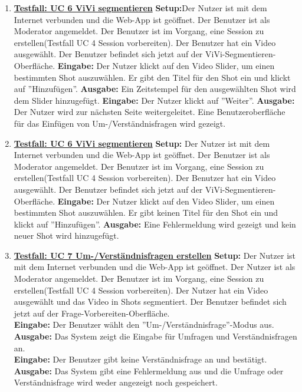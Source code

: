 \begin{enumerate}
	\item \underline{\textbf{Testfall: UC 6 ViVi segmentieren}} \linebreak
	\textbf{Setup:}Der Nutzer ist mit dem Internet verbunden und die Web-App ist geöffnet. Der Benutzer ist als Moderator angemeldet. Der Benutzer ist im Vorgang, eine Session zu erstellen(Testfall UC 4 Session vorbereiten). Der Benutzer hat ein Video ausgewählt. Der Benutzer befindet sich jetzt auf der ViVi-Segmentieren-Oberfläche.\linebreak
	\textbf{Eingabe:} Der Nutzer klickt auf den Video Slider, um einen bestimmten Shot auszuwählen. Er gibt den Titel für den Shot ein und klickt auf ''Hinzufügen''. \linebreak
	\textbf{Ausgabe:} Ein Zeitstempel für den ausgewählten Shot wird dem Slider hinzugefügt.\linebreak
	\textbf{Eingabe:} Der Nutzer klickt auf ''Weiter''. \linebreak
	\textbf{Ausgabe:} Der Nutzer wird zur nächsten Seite weitergeleitet. Eine Benutzeroberfläche für das Einfügen von Um-/Verständnisfragen wird gezeigt.
	
	\item \underline{\textbf{Testfall: UC 6 ViVi segmentieren}} \linebreak
	\textbf{Setup:} Der Nutzer ist mit dem Internet verbunden und die Web-App ist geöffnet. Der Benutzer ist als Moderator angemeldet. Der Benutzer ist im Vorgang, eine Session zu erstellen(Testfall UC 4 Session vorbereiten). Der Benutzer hat ein Video ausgewählt. Der Benutzer befindet sich jetzt auf der ViVi-Segmentieren-Oberfläche.\linebreak
	\textbf{Eingabe:} Der Nutzer klickt auf den Video Slider, um einen bestimmten Shot auszuwählen. Er gibt keinen Titel für den Shot ein und klickt auf ''Hinzufügen''. \linebreak
	\textbf{Ausgabe:} Eine Fehlermeldung wird gezeigt und kein neuer Shot wird hinzugefügt.
	
	\item \underline{\textbf{Testfall: UC 7 Um-/Verständnisfragen erstellen}} \linebreak
	\textbf{Setup:} Der Nutzer ist mit dem Internet verbunden und die Web-App ist geöffnet. Der Nutzer ist als Moderator angemeldet. Der Benutzer ist im Vorgang, eine Session zu erstellen(Testfall UC 4 Session vorbereiten). Der Nutzer hat ein Video ausgewählt und das Video in Shots segmentiert. Der Benutzer befindet sich jetzt auf der Frage-Vorbereiten-Oberfläche.\\
	\textbf{Eingabe:} Der Benutzer wählt den ''Um-/Verständnisfrage''-Modus aus. \\
	\textbf{Ausgabe:} Das System zeigt die Eingabe für Umfragen und Verständnisfragen an.\\ 
	\textbf{Eingabe:} Der Benutzer gibt keine Verständnisfrage an und bestätigt.\\
	\textbf{Ausgabe:} Das System gibt eine Fehlermeldung aus und die Umfrage oder Verständnisfrage wird weder angezeigt noch gespeichert.


\end{enumerate}
